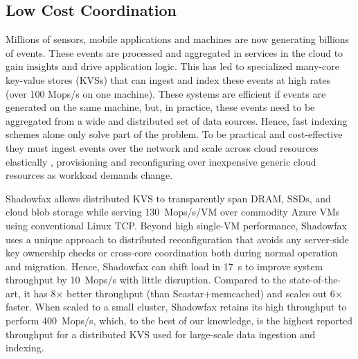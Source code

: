 \subsection{Low Cost Coordination}

Millions of sensors, mobile applications and machines are now
generating billions of events.
%
These events are processed and
aggregated in services in the cloud to gain insights and drive application
logic.
%
This has led to specialized many-core key-value stores (KVSs) that can
ingest and index these events at high rates (over 100 Mops/s on one machine).
%
These systems are efficient if events are
generated on the same machine, but,
%
in practice, these events need
to be aggregated from a wide and distributed set of data sources. Hence, fast
indexing schemes alone only solve part of the problem.
%
To be practical and
cost-effective they must ingest
events over the network and scale across cloud resources elastically
, provisioning and reconfiguring over inexpensive generic
cloud resources as workload demands change.

Shadowfax allows distributed KVS to
transparently span DRAM, SSDs, and cloud blob storage while serving
130~Mops/s/VM over commodity Azure VMs using conventional Linux TCP.
%
Beyond
high single-VM performance, Shadowfax uses a unique approach to distributed
reconfiguration that avoids any server-side key ownership checks
or cross-core coordination both during normal operation and migration.
%
Hence,
Shadowfax can shift load in 17~s to improve system throughput by
10~Mops/s
with little disruption. Compared to the state-of-the-art, it has 8$\times{}$ better throughput
  (than Seastar+memcached) and scales out 6$\times{}$ faster.
%
When scaled to a small cluster, Shadowfax retains its high throughput to
perform 400~Mops/s,
%
which, to the best of our knowledge, is the highest
reported throughput for a distributed KVS used for
large-scale data ingestion and indexing.
